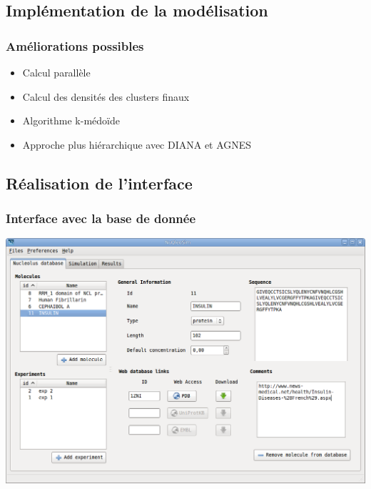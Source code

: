 \documentclass{beamer}
\begin{document}
\subsection{Implémentation de la modélisation}

\begin{frame}
  \frametitle{Améliorations possibles}
  \begin{block}{}
    \begin{itemize}
    \item Calcul parallèle
    \item Calcul des densités des clusters finaux
    \item Algorithme k-médoïde
    \item Approche plus hiérarchique avec DIANA et AGNES
    \end{itemize}
  \end{block}

\end{frame}

\subsection{Réalisation de l'interface}

\begin{frame}
  \frametitle{Interface avec la base de donnée}

  \begin{center}
      \includegraphics[width=0.9\columnwidth]{img/inter1.png}
  \end{center}

\end{frame}
\end{document}
